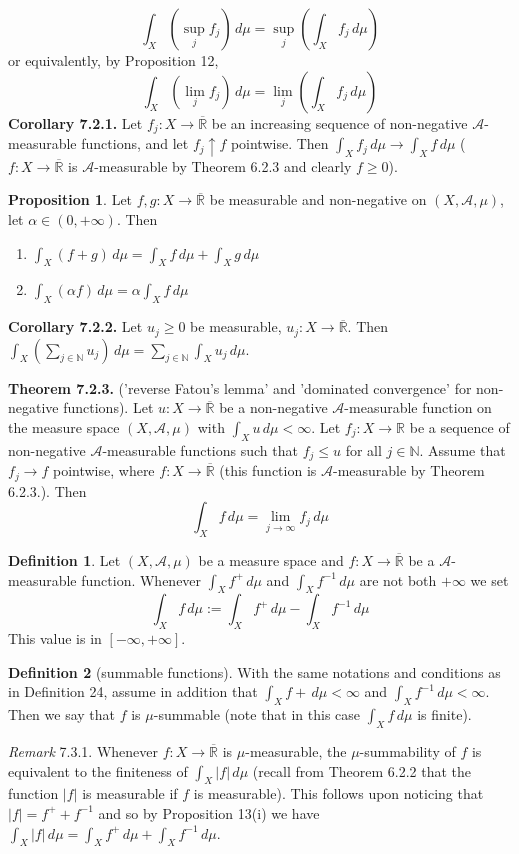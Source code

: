 \documentclass[a4paper,14pt]{extarticle}
\theoremstyle{definition}
\newtheorem{definition}{Definition}
\newtheorem{proposition}{Proposition}
\begin{document}
\[\int_X (\sup_j f_j) \,d\mu=\sup_j(\int_X f_j \,d\mu)\] or equivalently, by Proposition 12, \[\int_X (\lim_j f_j) \,d\mu=\lim_j(\int_X f_j \,d\mu)\]
\noindent\textbf{Corollary 7.2.1.} Let $f_j:X\rightarrow\overline{\mathbb{R}}$ be an increasing sequence of non-negative $\mathcal{A}$-measurable functions, and let $f_j\uparrow f$ pointwise. Then $\int_X f_j \,d\mu\rightarrow \int_X f\,d\mu$ ($f:X\rightarrow\overline{\mathbb{R}}$ is $\mathcal{A}$-measurable by Theorem 6.2.3 and clearly $f\geq 0$).
\begin{proposition}
  Let $f,g:X\rightarrow\overline{\mathbb{R}}$ be measurable and non-negative on $(X,\mathcal{A},\mu)$, let $\alpha\in(0,+\infty)$. Then 
  \begin{enumerate}
    \item $\int_X (f+g) \,d\mu=\int_X f \,d\mu + \int_X g \,d\mu$
    \item $\int_X (\alpha f) \,d\mu=\alpha\int_X f \,d\mu$
  \end{enumerate}
\end{proposition}
\noindent\textbf{Corollary 7.2.2.} Let $u_j\geq0$ be measurable, $u_j:X\rightarrow\overline{\mathbb{R}}$. Then $\int_X (\sum_{j\in\mathbb{N}} u_j) \,d\mu=\sum_{j\in\mathbb{N}}\int_X u_j \,d\mu$.

\vspace{12pt}

\noindent\textbf{Theorem 7.2.3.} ('reverse Fatou's lemma' and 'dominated convergence' for non-negative functions). Let $u:X\rightarrow\overline{\mathbb{R}}$ be a non-negative $\mathcal{A}$-measurable function on the measure space $(X,\mathcal{A},\mu)$ with $\int_X u \,d\mu<\infty$. Let $f_j:X\rightarrow\mathbb{R}$ be a sequence of non-negative $\mathcal{A}$-measurable functions such that $f_j\leq u$ for all $j\in\mathbb{N}$. Assume that $f_j\rightarrow f$ pointwise, where $f:X\rightarrow\overline{\mathbb{R}}$ (this function is $\mathcal{A}$-measurable by Theorem 6.2.3.). Then 
\[\int_X f \,d\mu=\lim\limits_{j\to\infty} f_j \,d\mu\]
\begin{definition}
  Let $(X,\mathcal{A},\mu)$ be a measure space and $f:X\rightarrow\overline{\mathbb{R}}$ be a $\mathcal{A}$-measurable function. Whenever $\int_X f^+ \,d\mu$ and $\int_X f^{-1} \,d\mu$ are not both $+\infty$ we set 
  \[\int_X f \,d\mu:=\int_X f^+ \,d\mu - \int_X f^{-1} \,d\mu\] This value is in $[-\infty,+\infty]$.
\end{definition}
\begin{definition}[summable functions]
  With the same notations and conditions as in Definition 24, assume in addition that $\int_X f+ \,d\mu<\infty$ and $\int_X f^{-1} \,d\mu<\infty$. Then we say that $f$ is $\mu$-summable (note that in this case $\int_X f \,d\mu$ is finite).
\end{definition}
\textit{Remark} 7.3.1. Whenever $f:X\rightarrow\overline{\mathbb{R}}$ is $\mu$-measurable, the $\mu$-summability of $f$ is equivalent to the finiteness of $\int_X |f| \,d\mu$ (recall from Theorem 6.2.2 that the function $|f|$ is measurable if $f$ is measurable). This follows upon noticing that $|f|=f^+ + f^{-1}$ and so by Proposition 13(i) we have $\int_X |f| \,d\mu = \int_X f^+ \,d\mu + \int_X f^{-1} \,d\mu$.
\end{document}
